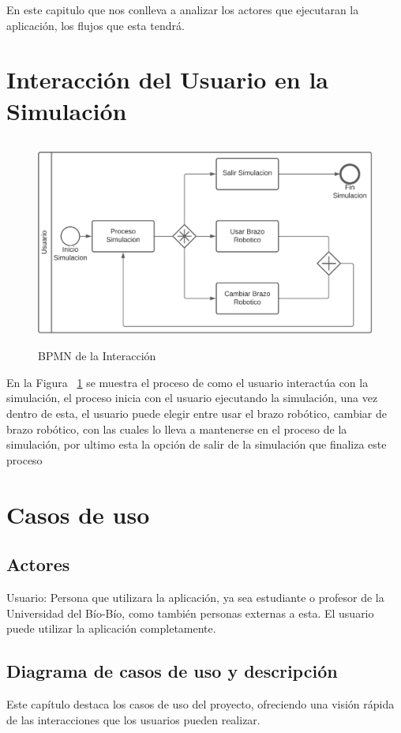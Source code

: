 En este capitulo que nos conlleva a analizar los actores que ejecutaran la aplicación, los flujos que esta tendrá.

\section{Interacción del Usuario en la Simulación}
\begin{figure}[h]
\centering
\includegraphics[height=6.83cm]{figures/bpmn.png}
\caption{BPMN de la Interacción}
\label{fig:bpmn}
\end{figure}

En la Figura ~\ref{fig:bpmn} se muestra el proceso de como el usuario interactúa con la simulación, el proceso inicia con el usuario ejecutando la simulación, una vez dentro de esta, el usuario puede elegir entre usar el brazo robótico, cambiar de brazo robótico, con las cuales lo lleva a mantenerse en el proceso de la simulación, por ultimo esta la opción de salir de la simulación que finaliza este proceso

\section{Casos de uso}
\subsection{Actores}
Usuario: Persona que utilizara la aplicación, ya sea estudiante o profesor de la Universidad del Bío-Bío, como también personas externas a esta. El usuario puede utilizar la aplicación completamente.

\subsection{Diagrama de casos de uso y descripción}
Este capítulo destaca los casos de uso del proyecto, ofreciendo una visión rápida de las interacciones que los usuarios pueden realizar.



